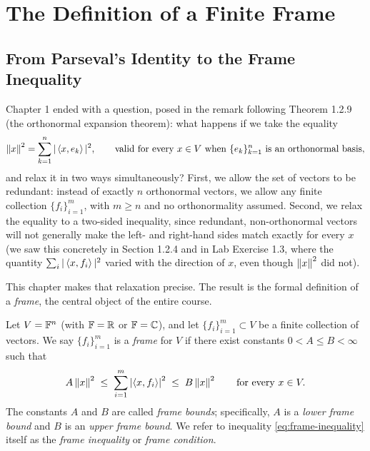 \chapter{The Definition of a Finite Frame}
\label{ch:definition}
\section{From Parseval's Identity to the Frame Inequality}
\label{sec:from-parseval}

Chapter 1 ended with a question, posed in the remark following Theorem 1.2.9 (the orthonormal expansion theorem): what happens if we take the equality
$$
\left\| x \right\|^2 = \sum_{k=1}^n |\left\langle x, e_k \right\rangle|^2, \qquad \text{valid for every } x \in V \text{ when } \{e_k\}_{k=1}^n \text{ is an orthonormal basis,}
$$
and relax it in two ways simultaneously? First, we allow the set of vectors to be redundant: instead of exactly $n$ orthonormal vectors, we allow any finite collection $\{f_i\}_{i=1}^m$, with $m \ge n$ and no orthonormality assumed. Second, we relax the equality to a two-sided inequality, since redundant, non-orthonormal vectors will not generally make the left- and right-hand sides match exactly for every $x$ (we saw this concretely in Section 1.2.4 and in Lab Exercise 1.3, where the quantity $\sum_i |\left\langle x, f_i \right\rangle|^2$ varied with the direction of $x$, even though $\left\| x \right\|^2$ did not).

This chapter makes that relaxation precise. The result is the formal definition of a \emph{frame}, the central object of the entire course.

\begin{definition}
\label{def:frame}
Let $V = \mathbb{F}^n$ (with $\mathbb{F} = \mathbb{R}$ or $\mathbb{F} = \mathbb{C}$), and let $\{f_i\}_{i=1}^m \subset V$ be a finite collection of vectors. We say $\{f_i\}_{i=1}^m$ is a \emph{frame} for $V$ if there exist constants $0 < A \leq B < \infty$ such that
\begin{equation}
\label{eq:frame-inequality}
A \left\| x \right\|^2 \;\leq\; \sum_{i=1}^m \left| \left\langle x, f_i \right\rangle \right|^2 \;\leq\; B \left\| x \right\|^2 \qquad \text{for every } x \in V.
\end{equation}
The constants $A$ and $B$ are called \emph{frame bounds}; specifically, $A$ is a \emph{lower frame bound} and $B$ is an \emph{upper frame bound}. We refer to inequality \eqref{eq:frame-inequality} itself as the \emph{frame inequality} or \emph{frame condition}.
\end{definition}

